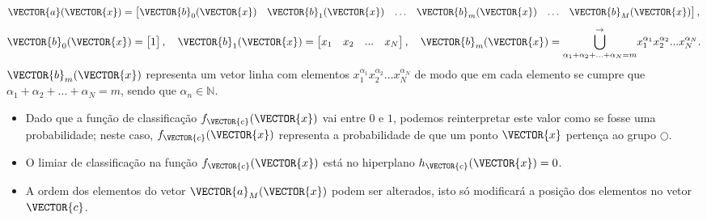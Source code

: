\begin{theorem}
\begin{equation}
\end{equation}
\begin{equation}\label{eq:reglogrnr1poly:3}
\VECTOR{a}(\VECTOR{x})=
\begin{bmatrix}
\VECTOR{b}_0(\VECTOR{x}) &
\VECTOR{b}_1(\VECTOR{x}) &
\hdots &
\VECTOR{b}_m(\VECTOR{x}) &
\hdots &
\VECTOR{b}_M(\VECTOR{x}) 
\end{bmatrix},
\end{equation}
\begin{equation}\label{eq:reglogrnr1poly:4}
\VECTOR{b}_0(\VECTOR{x})=
\begin{bmatrix}
1 
\end{bmatrix},
\quad 
\VECTOR{b}_1(\VECTOR{x})=
\begin{bmatrix}
x_1 & x_2 & ... &  x_N
\end{bmatrix},
\quad 
\VECTOR{b}_m(\VECTOR{x})=
{\bigcup\limits_{\alpha_1+\alpha_2+...+\alpha_N=m}^{\rightarrow}}{x_1^{\alpha_1} x_2^{\alpha_2} ... x_N^{\alpha_N}} .
\end{equation}
$\VECTOR{b}_m(\VECTOR{x})$ representa um vetor linha com elementos $x_1^{\alpha_1} x_2^{\alpha_2} ... x_N^{\alpha_N}$
de modo que em cada elemento se cumpre que $\alpha_1+\alpha_2+...+\alpha_N=m$,
sendo que $\alpha_n \in \mathbb{N}$.
\end{theorem}

\begin{tcbattention}
\begin{itemize}
\item Dado que a função de classificação $f_{\VECTOR{c}}(\VECTOR{x})$ vai entre $0$ e $1$,
podemos reinterpretar este valor como se fosse uma probabilidade;
neste caso, $f_{\VECTOR{c}}(\VECTOR{x})$ representa a probabilidade de que um ponto $\VECTOR{x}$
pertença ao grupo $\bigcirc$.
\item O limiar de classificação na função $f_{\VECTOR{c}}(\VECTOR{x})$ está no hiperplano $h_{\VECTOR{c}}(\VECTOR{x})=0$.
\item A ordem dos elementos do vetor $\VECTOR{a}_M(\VECTOR{x})$ podem ser alterados,
isto só modificará a posição dos elementos no vetor $\VECTOR{c}$.
\end{itemize}
\end{tcbattention}


